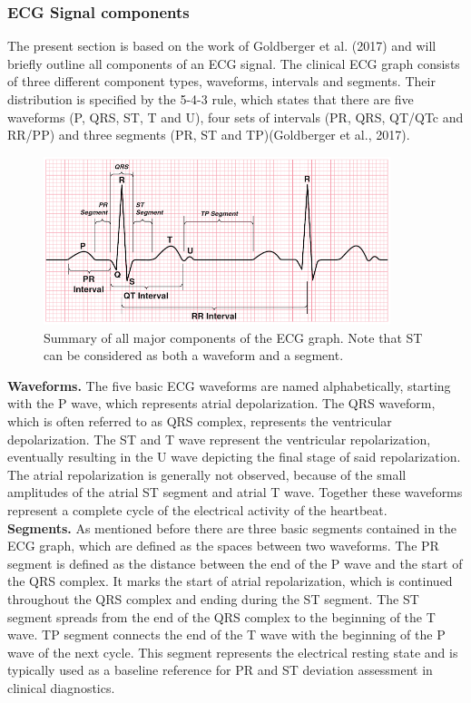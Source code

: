 \subsubsection{ECG Signal components}
The present section is based on the work of Goldberger et al. (2017) and will briefly outline all components of an ECG signal. The clinical ECG graph consists of three different component types, waveforms, intervals and segments. Their distribution is specified by the 5-4-3 rule, which states that there are five waveforms (P, QRS, ST, T and U), four sets of intervals (PR, QRS, QT/QTc and RR/PP) and three segments (PR, ST and TP)(Goldberger et al., 2017).

\begin{figure}[ht]
\centering
\includegraphics[width=0.9\textwidth]{images/ecgcomp.png}
\caption{Summary of all major components of the ECG graph. Note that ST can be considered as both a waveform and a segment.\citep{GOLDBERGER2017}}
\label{ecgcompImg}
\end{figure}

\textbf{Waveforms.} The five basic ECG waveforms are named alphabetically, starting with the P wave, which represents atrial depolarization. The QRS waveform, which is often referred to as QRS complex, represents the ventricular depolarization. The ST and T wave represent the ventricular repolarization, eventually resulting in the U wave depicting the final stage of said repolarization. The atrial repolarization is generally not observed, because of the small amplitudes of the atrial ST segment and atrial T wave. Together these waveforms represent a complete cycle of the electrical activity of the heartbeat.\\

\textbf{Segments.} As mentioned before there are three basic segments contained in the ECG graph, which are defined as the spaces between two waveforms. The PR segment is defined as the distance between the end of the P wave and the start of the QRS complex. It marks the start of atrial repolarization, which is continued throughout the QRS complex and ending during the ST segment. The ST segment spreads from the end of the QRS complex to the beginning of the T wave. TP segment connects the end of the T wave with the beginning of the P wave of the next cycle. This segment represents the electrical resting state and is typically used as a baseline reference for PR and ST deviation assessment in clinical diagnostics.\\

